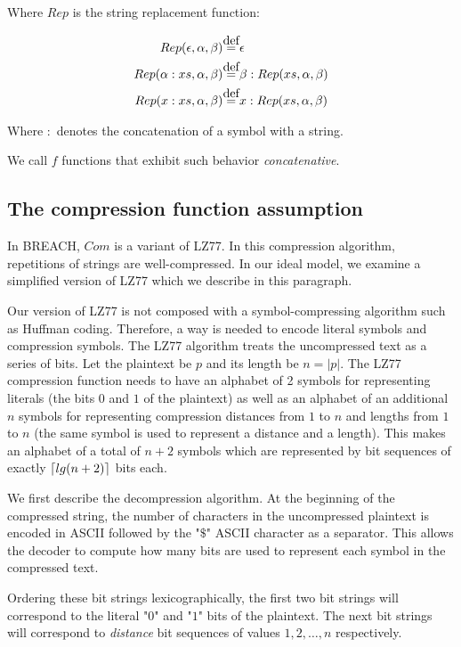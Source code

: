 \documentclass{article}
\DeclarePairedDelimiter{\ceil}{\lceil}{\rceil}
\newcommand\defeq{\stackrel{\mathclap{\normalfont\mbox{def}}}{=}}
\begin{document}
Where $Rep$ is the string replacement function:

\begin{align*}
Rep(\epsilon, \alpha, \beta) &\defeq \epsilon\\
Rep(\alpha:xs, \alpha, \beta) &\defeq \beta:Rep(xs, \alpha, \beta)\\
Rep(x:xs, \alpha, \beta) &\defeq x:Rep(xs, \alpha, \beta)
\end{align*}

Where $:$ denotes the concatenation of a symbol with a string.

We call $f$ functions that exhibit such behavior \textit{concatenative}.

\subsection{The compression function assumption}

In BREACH, $Com$ is a variant of LZ77. In this compression algorithm, repetitions
of strings are well-compressed. In our ideal model, we examine a simplified version
of LZ77 which we describe in this paragraph.

Our version of LZ77 is not composed with a symbol-compressing algorithm such as
Huffman coding. Therefore, a way is needed to encode literal symbols and compression
symbols. The LZ77 algorithm treats the uncompressed text as a series of bits. Let the
plaintext be $p$ and its length be $n = |p|$. The LZ77 compression function needs
to have an alphabet of 2 symbols for representing literals (the bits $0$ and $1$ of
the plaintext) as well as an alphabet of an additional $n$ symbols for representing compression distances from $1$ to $n$ and lengths from $1$ to $n$ (the same symbol is
used to represent a distance and a length). This makes an alphabet of a total of
$n + 2$ symbols which are represented by bit sequences of exactly $\ceil{lg(n + 2)}$
bits each.

We first describe the decompression algorithm. At the beginning of the compressed
string, the number
of characters in the uncompressed plaintext is encoded in ASCII followed by the "$\$$"
ASCII character as a separator. This allows the decoder to compute how many bits are used to
represent each symbol in the compressed text.

Ordering these bit strings lexicographically, the first two bit strings will correspond to the literal
"$0$" and "$1$" bits of the plaintext. The next bit strings will correspond to \textit{distance} bit sequences of 
values $1, 2, \ldots, n$ respectively.
\end{document}
